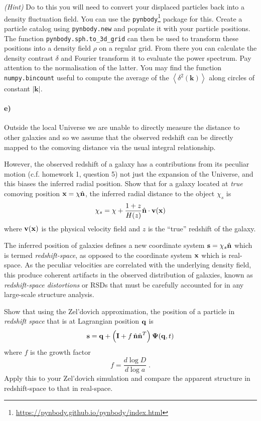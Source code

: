 \documentclass[12pt]{article}
\begin{document}
\emph{(Hint)} Do to this you will need to convert your displaced particles back
into a density fluctuation field. You can use the
\texttt{pynbody}\footnote{\url{https://pynbody.github.io/pynbody/index.html}}
package for this. Create a particle catalog using \texttt{pynbody.new} and
populate it with your particle positions. The function
\texttt{pynbody.sph.to\_3d\_grid} can then be used to transform these positions
into a density field $\rho$ on a regular grid. From there you can calculate the
density contrast $\delta$ and Fourier transform it to evaluate the power
spectrum. Pay attention to the normalisation of the latter. You may find the
function \texttt{numpy.bincount} useful to compute the average of the
$\left<\delta^2(\mathbf{k})\right>$ along circles of constant
$\left|\mathbf{k}\right|$.

\paragraph{e)} Outside the local Universe we are unable to directly measure the distance to other galaxies and so we assume that the observed redshift can be directly mapped to the comoving distance via the usual integral relationship.

However, the observed redshift of a galaxy has a contributions from its peculiar motion (c.f. homework 1, question 5) not just the expansion of the Universe, and this biases the inferred radial position. Show that for a galaxy located at \emph{true} comoving position ${\boldsymbol{\mathbf{x}}} = \chi \hat{{\boldsymbol{\mathbf{n}}}}$, the inferred radial distance to the object $\chi_s$ is
\begin{equation}
    \chi_s = \chi + \frac{1 + z}{H(z)}\hat{{\boldsymbol{\mathbf{n}}}} \cdot {\boldsymbol{\mathbf{v}}}({\boldsymbol{\mathbf{x}}})
\end{equation}
where ${\boldsymbol{\mathbf{v}}}({\boldsymbol{\mathbf{x}}})$ is the physical velocity field and $z$ is the ``true'' redshift of the galaxy.

The inferred position of galaxies defines a new coordinate system ${\boldsymbol{\mathbf{s}}} = \chi_s \hat{{\boldsymbol{\mathbf{n}}}}$ which is termed \emph{redshift-space}, as opposed to the coordinate system ${\boldsymbol{\mathbf{x}}}$ which is real-space. As the peculiar velocities are correlated with the underlying density field, this produce coherent artifacts in the observed distribution of galaxies, known as \emph{redshift-space distortions} or RSDs that must be carefully accounted for in any large-scale structure analysis.

Show that using the Zel'dovich approximation, the position of a particle in \emph{redshift space} that is at Lagrangian position ${\boldsymbol{\mathbf{q}}}$ is
\begin{equation}
{\boldsymbol{\mathbf{s}}} = {\boldsymbol{\mathbf{q}}} + \left(\mathbf{I} + f \, \hat{{\boldsymbol{\mathbf{n}}}} \hat{{\boldsymbol{\mathbf{n}}}}^T\right) \mathbf{\Psi}({\boldsymbol{\mathbf{q}}}, t)
\end{equation}
where $f$ is the growth factor
\begin{equation}
f = \frac{d \log D}{d \log a} \; .
\end{equation}
Apply this to your Zel'dovich simulation and compare the apparent structure in redshift-space to that in real-space.
\end{document}
